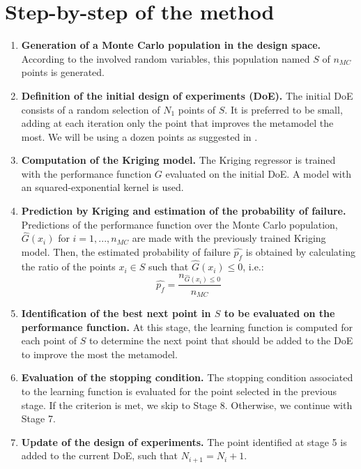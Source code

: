 \section{Step-by-step of the method}
\begin{enumerate}
    \item \textbf{Generation of a Monte Carlo population in the design space.}
    According to the involved random variables, this population named $S$ of $n_{MC}$ points 
    is generated.
    \item \textbf{Definition of the initial design of experiments (DoE).} The initial
    DoE consists of a random selection of $N_1$ points of $S$. It is preferred to be
    small, adding at each iteration only the point that improves the metamodel
    the most. We will be using a dozen points as suggested in \citep{Echard2011}.
    \item \textbf{Computation of the Kriging model.} The Kriging regressor is trained
    with the performance function $G$ evaluated on the initial DoE. A model with an
    squared-exponential kernel is used.
    \item \textbf{Prediction by Kriging and estimation of the probability of failure.}
    Predictions of the performance function over the Monte Carlo population, $\widehat{G}(x_i)$
    for $i = 1, ..., n_{MC}$ are made with the previously trained Kriging model. 
    Then, the estimated probability of failure $\widehat{p_f}$ is obtained by calculating the ratio
    of the points $x_i \in S$ such that $\widehat{G}(x_i) \leq 0$, i.e.:
    \begin{equation}
        \widehat{p_f} = \frac{n_{\widehat{G}(x_i) \leq 0}}{n_{MC}}
    \end{equation}
    \item \textbf{Identification of the best next point in $S$ to be evaluated on the
    performance function.} At this stage, the learning function is computed for each
    point of $S$ to determine the next point that should be added to the DoE to
    improve the most the metamodel.
    \item \textbf{Evaluation of the stopping condition.} The stopping condition
    associated to the learning function is evaluated for the point selected in the
    previous stage. If the criterion is met, we skip to Stage 8. Otherwise, we
    continue with Stage 7.
    \item \textbf{Update of the design of experiments.}
    The point identified at stage 5 is added to the current DoE, such that $N_{i+1} = N_i + 1$.

\end{enumerate}
